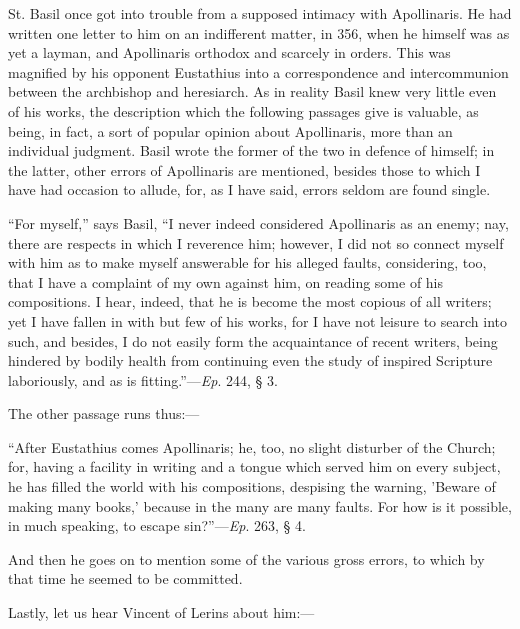 St. Basil once got into trouble from a supposed intimacy with
Apollinaris. He had written one letter to him on an indifferent
matter, in 356, when he himself was as yet a layman, and
Apollinaris orthodox and scarcely in orders. This was magnified by his
opponent Eustathius into a correspondence and intercommunion between
the archbishop and heresiarch. As in reality Basil knew very little
even of his works, the description which the following passages give
is valuable, as being, in fact, a sort of popular opinion about
Apollinaris, more than an individual judgment. Basil wrote the former
of the two in defence of himself; in the latter, other errors of
Apollinaris are mentioned, besides those to which I have had occasion
to allude, for, as I have said, errors seldom are found single.

``For myself,'' says Basil, ``I never indeed considered
Apollinaris as an enemy; nay, there are respects in which I reverence
him; however, I did not so connect myself with him as to make myself
answerable for his alleged faults, considering, too, that I have a
complaint of my own against him, on reading some of his compositions.
I hear, indeed, that he is become the most copious of all writers; yet
I have fallen in with but few of his works, for I have not leisure to
search into such, and besides, I do not easily form the acquaintance
of recent writers, being hindered by bodily health from continuing
even the study of inspired Scripture laboriously, and as is
fitting.''—\emph{Ep}. 244, § 3.

The other passage runs thus:—

``After Eustathius comes Apollinaris; he, too, no slight
disturber of the Church; for, having a facility in writing and a
tongue which served him on every subject, he has filled the world with
his compositions, despising the warning, 'Beware of making many
books,' because in the many are many faults. For how is it possible,
in much speaking, to escape sin?''—\emph{Ep}. 263, § 4.

And then he goes on to mention some of the various gross errors, to
which by that time he seemed to be committed.

Lastly, let us hear Vincent of Lerins about him:—

